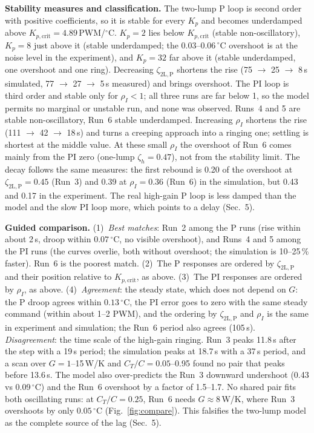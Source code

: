\documentclass[reprint, amsmath, amssymb, aps, floatfix]{revtex4-2}
\newcommand{\degC}{\,^\circ\mathrm{C}}
\newcommand{\zP}{\zeta_{\mathrm{2L,P}}}
\newcommand{\Kpc}{K_{p,\mathrm{crit}}}
\begin{document}
\textbf{Stability measures and classification.} The two-lump P loop is second order with
positive coefficients, so it is stable for every $K_p$ and becomes underdamped above
$\Kpc = 4.89$\,PWM/$^\circ$C. $K_p = 2$ lies below $\Kpc$ (stable non-oscillatory),
$K_p = 8$ just above it (stable underdamped; the 0.03--0.06$\degC$ overshoot is at the noise
level in the experiment), and $K_p = 32$ far above it (stable underdamped, one overshoot and
one ring). Decreasing $\zP$ shortens the rise (75 $\to$ 25 $\to$ 8\,s simulated, 77 $\to$ 27
$\to$ 5\,s measured) and brings overshoot. The PI loop is third order and stable only for
$\rho_I < 1$; all three runs are far below 1, so the model permits no marginal or unstable
run, and none was observed. Runs~4 and 5 are stable non-oscillatory, Run~6 stable
underdamped. Increasing $\rho_I$ shortens the rise (111 $\to$ 42 $\to$ 18\,s) and turns a
creeping approach into a ringing one; settling is shortest at the middle value. At these
small $\rho_I$ the overshoot of Run~6 comes mainly from the PI zero (one-lump
$\zeta_h = 0.47$), not from the stability limit. The decay follows the same measures: the
first rebound is 0.20 of the overshoot at $\zP = 0.45$ (Run~3) and 0.39 at $\rho_I = 0.36$
(Run~6) in the simulation, but 0.43 and 0.17 in the experiment. The real high-gain P loop is
less damped than the model and the slow PI loop more, which points to a delay (Sec.~5).

\textbf{Guided comparison.} (1)~\emph{Best matches}: Run~2 among the P runs (rise within
about 2\,s, droop within $0.07\degC$, no visible overshoot), and Runs~4 and 5 among the PI runs
(the curves overlie, both without overshoot; the simulation is 10--25\,\% faster). Run~6 is
the poorest match. (2)~The P responses are ordered by $\zP$ and their position relative to
$\Kpc$, as above. (3)~The PI responses are ordered by $\rho_I$, as above.
(4)~\emph{Agreement}: the steady state, which does not depend on $G$: the P droop agrees
within $0.13\degC$, the PI error goes to zero with the same steady command (within about
1--2 PWM), and the ordering by $\zP$ and $\rho_I$ is the same in experiment and
simulation; the Run~6 period also agrees (105\,s). \emph{Disagreement}: the time scale of the
high-gain ringing. Run~3 peaks 11.8\,s after the step with a 19\,s period; the simulation
peaks at 18.7\,s with a 37\,s period, and a scan over $G = 1$--15\,W/K and
$C_T/C = 0.05$--0.95 found no pair that peaks before 13.6\,s. The model also over-predicts
the Run~3 downward undershoot (0.43 vs 0.09$\degC$) and the Run~6 overshoot by a factor of
1.5--1.7. No shared pair fits both oscillating runs: at $C_T/C = 0.25$, Run~6 needs
$G \approx 8$\,W/K, where Run~3 overshoots by only $0.05\degC$
(Fig.~\ref{fig:compare}). This falsifies the two-lump model as the complete source of the
lag (Sec.~5).
\end{document}

